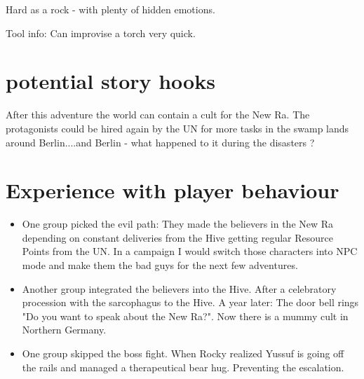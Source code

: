 \begin{npcBox}[title=Lost: Rocky]
    \begin{stressSection}
    \end{stressSection}
    \begin{tabularx}{\textwidth}{ XX }
    \end{tabularx}

    \begin{consequences}
    \item {}
    \item {}
    \item {}
    \end{consequences}

    \begin{npcDescription}

    Hard as a rock - with plenty of hidden emotions.

    Tool info: Can improvise a torch very quick.

    \end{npcDescription}

\end{npcBox}





\section{potential story hooks}

After this adventure the world can contain a cult for the New Ra. The protagonists could be hired again by the UN for more tasks in the swamp lands around Berlin....and Berlin - what happened to it during the disasters ?

\section{Experience with player behaviour}

\begin{itemize}
    \item One group picked the evil path: They made the believers in the New Ra depending on constant deliveries from the Hive getting regular Resource Points from the UN. In a campaign I would switch those characters into NPC mode and make them the bad guys for the next few adventures.
    \item Another group integrated the believers into the Hive. After a celebratory procession with the sarcophagus to the Hive. A year later: The door bell rings "Do you want to speak about the New Ra?". Now there is a mummy cult in Northern Germany.
    \item One group skipped the boss fight. When Rocky realized Yussuf is going off the rails and managed a therapeutical bear hug. Preventing the escalation.
\end{itemize}


